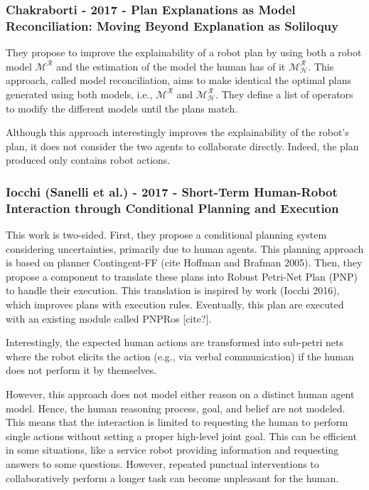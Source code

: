 \subsubsection{Chakraborti - 2017 - Plan Explanations as Model Reconciliation: Moving Beyond Explanation as Soliloquy}
\label{w2}

They propose to improve the explainability of a robot plan by using both a robot model $\mathcal{M^R}$ and the estimation of the model the human has of it $\mathcal{M^R_H}$. This approach, called model reconciliation, aims to make identical the optimal plans generated using both models, i.e., $\mathcal{M^R}$ and $\mathcal{M^R_H}$. They define a list of operators to modify the different models until the plans match. 

Although this approach interestingly improves the explainability of the robot's plan, it does not consider the two agents to collaborate directly. Indeed, the plan produced only contains robot actions.  

\subsubsection{Iocchi (Sanelli et al.) - 2017 - Short-Term Human-Robot Interaction through Conditional Planning and Execution}
\label{w3}

This work is two-sided. First, they propose a conditional planning system considering uncertainties, primarily due to human agents. This planning approach is based on planner Contingent-FF (cite Hoffman and Brafman 2005). Then, they propose a component to translate these plans into Robust Petri-Net Plan (PNP) to handle their execution. This translation is inspired by work (Iocchi 2016), which improves plans with execution rules. Eventually, this plan are executed with an existing module called PNPRos [cite?].

Interestingly, the expected human actions are transformed into sub-petri nets where the robot elicits the action (e.g., via verbal communication) if the human does not perform it by themselves. 

However, this approach does not model either reason on a distinct human agent model. Hence, the human reasoning process, goal, and belief are not modeled. This means that the interaction is limited to requesting the human to perform single actions without setting a proper high-level joint goal. This can be efficient in some situations, like a service robot providing information and requesting answers to some questions. However, repeated punctual interventions to collaboratively perform a longer task can become unpleasant for the human.

